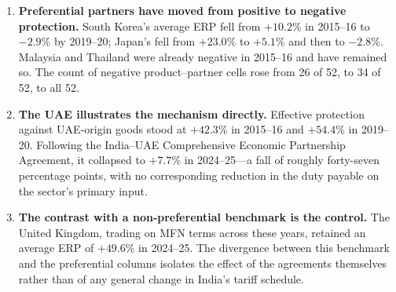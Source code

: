 \documentclass[11pt, a4paper]{article}
\numberwithin{figure}{section}
\numberwithin{table}{section}
\begin{document}
\begin{enumerate}
    \item \textbf{Preferential partners have moved from positive to negative protection.} South Korea's average ERP fell from $+10.2$\% in 2015--16 to $-2.9$\% by 2019--20; Japan's fell from $+23.0$\% to $+5.1$\% and then to $-2.8$\%. Malaysia and Thailand were already negative in 2015--16 and have remained so. The count of negative product--partner cells rose from 26 of 52, to 34 of 52, to all 52.
    \item \textbf{The UAE illustrates the mechanism directly.} Effective protection against UAE-origin goods stood at $+42.3$\% in 2015--16 and $+54.4$\% in 2019--20. Following the India--UAE Comprehensive Economic Partnership Agreement, it collapsed to $+7.7$\% in 2024--25---a fall of roughly forty-seven percentage points, with no corresponding reduction in the duty payable on the sector's primary input.
    \item \textbf{The contrast with a non-preferential benchmark is the control.} The United Kingdom, trading on MFN terms across these years, retained an average ERP of $+49.6$\% in 2024--25. The divergence between this benchmark and the preferential columns isolates the effect of the agreements themselves rather than of any general change in India's tariff schedule.
\end{enumerate}
\end{document}
